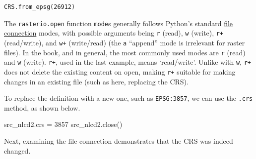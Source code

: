 \documentclass[
  letterpaper,
]{krantz}
\newenvironment{Shaded}{\begin{snugshade}}{\end{snugshade}}
\newcommand{\DecValTok}[1]{\textcolor[rgb]{0.68,0.00,0.00}{#1}}
\newcommand{\NormalTok}[1]{\textcolor[rgb]{0.00,0.23,0.31}{#1}}
\newcommand{\OperatorTok}[1]{\textcolor[rgb]{0.37,0.37,0.37}{#1}}
\begin{document}
\begin{verbatim}
CRS.from_epsg(26912)
\end{verbatim}

\begin{tcolorbox}[enhanced jigsaw, title=\textcolor{quarto-callout-note-color}{\faInfo}\hspace{0.5em}{Note}, coltitle=black, colbacktitle=quarto-callout-note-color!10!white, breakable, titlerule=0mm, colframe=quarto-callout-note-color-frame, opacitybacktitle=0.6, colback=white, bottomrule=.15mm, left=2mm, leftrule=.75mm, toprule=.15mm, toptitle=1mm, bottomtitle=1mm, arc=.35mm, opacityback=0, rightrule=.15mm]

The \texttt{rasterio.open} function \texttt{mode}s generally follows
Python's standard
\href{https://docs.python.org/3/tutorial/inputoutput.html\#reading-and-writing-files}{file
connection} modes, with possible arguments being
\texttt{\textquotesingle{}r\textquotesingle{}} (read),
\texttt{\textquotesingle{}w\textquotesingle{}} (write),
\texttt{\textquotesingle{}r+\textquotesingle{}} (read/write), and
\texttt{\textquotesingle{}w+\textquotesingle{}} (write/read) (the
\texttt{\textquotesingle{}a\textquotesingle{}} ``append'' mode is
irrelevant for raster files). In the book, and in general, the most
commonly used modes are \texttt{\textquotesingle{}r\textquotesingle{}}
(read) and \texttt{\textquotesingle{}w\textquotesingle{}} (write).
\texttt{\textquotesingle{}r+\textquotesingle{}}, used in the last
example, means `read/write'. Unlike with
\texttt{\textquotesingle{}w\textquotesingle{}},
\texttt{\textquotesingle{}r+\textquotesingle{}} does not delete the
existing content on open, making
\texttt{\textquotesingle{}r+\textquotesingle{}} suitable for making
changes in an existing file (such as here, replacing the CRS).

\end{tcolorbox}

To replace the definition with a new one, such as \texttt{EPSG:3857}, we
can use the \texttt{.crs} method, as shown below.

\begin{Shaded}
\begin{Highlighting}[]
\NormalTok{src\_nlcd2.crs }\OperatorTok{=} \DecValTok{3857}
\NormalTok{src\_nlcd2.close()}
\end{Highlighting}
\end{Shaded}

Next, examining the file connection demonstrates that the CRS was indeed
changed.
\end{document}
